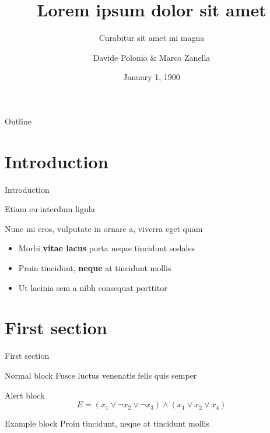 \documentclass{beamer}
\title{Lorem ipsum dolor sit amet}
\subtitle{Curabitur sit amet mi magna}
\author{Davide Polonio \& Marco Zanella}
\date{January 1, 1900}
\begin{document}
	\maketitle

	\begin{frame}{Outline}
		\tableofcontents
	\end{frame}


	\section{Introduction}

	\begin{frame}{Introduction}

		Etiam eu interdum ligula

		Nunc mi eros, vulputate in ornare a, viverra eget quam \vspace{.5em}

		\begin{itemize}
			\item Morbi \textbf{vitae lacus} porta neque tincidunt sodales \vspace{.5em}
			\item Proin tincidunt, \textbf{neque} at tincidunt mollis \vspace{.5em}
			\item Ut \alert{lacinia sem a nibh} consequat porttitor
		\end{itemize}
	\end{frame}


	\section{First section}

	\begin{frame}{First section}
		\begin{block}{Normal block}
			Fusce luctus venenatis felis quis semper
		\end{block}

		\begin{alertblock}{Alert block}
			$$ E = (x_1 \vee \neg x_2 \vee \neg x_3) \wedge (x_1 \vee x_2 \vee x_4) $$
		\end{alertblock}

		\begin{exampleblock}{Example block}
			Proin tincidunt, neque at tincidunt mollis
		\end{exampleblock}
	\end{frame}
\end{document}
